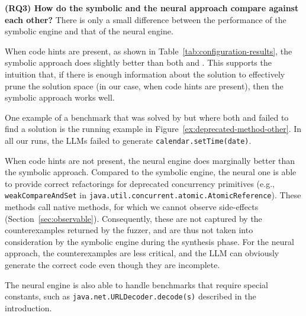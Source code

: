 \documentclass[sigconf,review,anonymous]{acmart}
\begin{document}
\noindent
{\bf (RQ3) How do the symbolic and the neural approach compare against each other?}
%
There is only a small difference between the performance of the symbolic
engine and that of the neural engine.



When code hints are present, as shown in
Table~\ref{tab:configuration-results}, the symbolic approach does slightly
better than both \llma and \llmb.  This supports the intuition that, if
there is enough information about the solution to effectively prune the
solution space (in our case, when code hints are present),
%
then the symbolic approach works well. %

One example of a benchmark that was solved by \tool but where both \llma and
\llmb failed to find a solution is the running example in
Figure~\ref{ex:deprecated-method-other}.  In all our runs, the LLMs failed
to generate \lstinline[breaklines=true]{calendar.setTime(date)}.

When code hints are not present, the neural engine does marginally better
than the symbolic approach.
%
%
%
%
Compared to the symbolic engine, the neural one is able to provide correct
refactorings for deprecated concurrency primitives (e.g.,
\lstinline{weakCompareAndSet} in
\lstinline[breaklines=true]{java.util.concurrent.atomic.AtomicReference}). 
These methods call native methods, for which we cannot observe side-effects
(Section~\ref{sec:observable}).  Consequently, these are not captured by
the counterexamples returned by the fuzzer, and are thus not taken into
consideration by the symbolic engine during the synthesis phase.  For the
neural approach, the counterexamples are less critical, and the LLM can
obviously generate the correct code even though they are incomplete.

%
The neural engine is also able to handle benchmarks that require special
constants, such as
\lstinline[breaklines=true]{java.net.URLDecoder.decode(s)} described in the
introduction.
\end{document}
